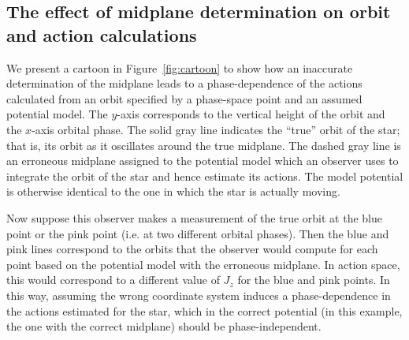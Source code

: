\documentclass[twocolumn]{aastex62}
\begin{document}
\subsection{The effect of midplane determination on orbit and action
calculations} \label{ssec:cartoon} We present a cartoon in
Figure~\ref{fig:cartoon} to show how an inaccurate determination of the
midplane leads to a phase-dependence of the actions calculated from an orbit
specified by a phase-space point and an assumed potential model. The $y$-axis
corresponds to the vertical height of the orbit and the $x$-axis orbital
phase. The solid gray line indicates the ``true'' orbit of the star; that is,
its orbit as it oscillates around the true midplane. The dashed gray line is
an erroneous midplane assigned to the potential model which an observer uses
to integrate the orbit of the star and hence estimate its actions. The model
potential is otherwise identical to the one in which the star is actually
moving.

Now suppose this observer makes a measurement of the true orbit at the blue
point or the pink point (i.e. at two different orbital phases). Then the blue
and pink lines correspond to the orbits that the observer would compute for
each point based on the potential model with the erroneous midplane. In action
space, this would correspond to a different value of $J_z$ for the blue and
pink points. In this way, assuming the wrong coordinate system induces a
phase-dependence in the actions estimated for the star, which in the correct
potential (in this example, the one with the correct midplane) should be
phase-independent.

\begin{figure*}
\caption{Cartoon showing the effect an error in the determination of the
coordinate midplane can have on orbit integration and action estimation. The
$x$-axis shows the orbital phase and the $y$-axis the vertical height. The top
gray curve depicts an example ``true'' orbit oscillating about the true
midplane (horizontal solid gray line). Consider an observer who erroneously
assumes the midplane is located at the horizontal dashed line. Suppose this
observer measures the phase-space position of the star at two different
orbital phases (blue and pink points). If the observer were then to integrate
the star's orbit using a model potential with the erroneous midplane, they
would obtain the blue and pink curves for the star's orbit, respectively. The
actions estimated from these two  erroneous orbits would subsequently differ,
both from each other and from the actions estimated for the true orbit (in the
potential with the correct midplane). Hence an incorrect midplane in the
potential model assumed will induce phase-dependence in the actions estimated
for a given star in that potential.}
\label{fig:cartoon}
\end{figure*}
\end{document}
